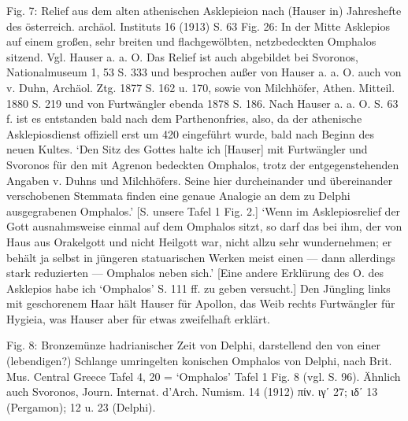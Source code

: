 \documentclass[a4paper, 11pt, oneside]{article}
\begin{document}
Fig. 7: Relief aus dem alten athenischen Asklepieion nach (Hauser in) Jahreshefte des österreich. archäol. Instituts 16 (1913) S. 63 Fig. 26: In der Mitte Asklepios auf einem großen, sehr breiten und flachgewölbten, netzbedeckten Omphalos sitzend. Vgl. Hauser a. a. O. Das Relief ist auch abgebildet bei Svoronos, Nationalmuseum 1, 53 S. 333 und besprochen außer von Hauser a. a. O. auch von v. Duhn, Archäol. Ztg. 1877 S. 162 u. 170, sowie von Milchhöfer, Athen. Mitteil. 1880 S. 219 und von Furtwängler ebenda 1878 S. 186. Nach Hauser a. a. O. S. 63 f. ist es entstanden bald nach dem Parthenonfries, also, da der athenische Asklepiosdienst offiziell erst um 420 eingeführt wurde, bald nach Beginn des neuen Kultes. `Den Sitz des Gottes halte ich [Hauser] mit Furtwängler und Svoronos für den mit Agrenon bedeckten Omphalos, trotz der entgegenstehenden Angaben v. Duhns und Milchhöfers. Seine hier durcheinander und übereinander verschobenen Stemmata finden eine genaue Analogie an dem zu Delphi ausgegrabenen Omphalos.' [S. unsere Tafel 1 Fig. 2.] `Wenn im Asklepiosrelief der Gott ausnahmsweise einmal auf dem Omphalos sitzt, so darf das bei ihm, der von Haus aus Orakelgott und nicht Heilgott war, nicht allzu sehr wundernehmen; er behält ja selbst in jüngeren statuarischen Werken meist einen --- dann allerdings stark reduzierten --- Omphalos neben sich.' [Eine andere Erklürung des O. des Asklepios habe ich `Omphalos' S. 111 ff. zu geben versucht.] Den Jüngling links mit geschorenem Haar hält Hauser für Apollon, das Weib rechts Furtwängler für Hygieia, was Hauser aber für etwas zweifelhaft erklärt.

Fig. 8: Bronzemünze hadrianischer Zeit von Delphi, darstellend den von einer (lebendigen?) Schlange umringelten konischen Omphalos von Delphi, nach Brit. Mus. Central Greece Tafel 4, 20 = `Omphalos' Tafel 1 Fig. 8 (vgl. S. 96). Ähnlich auch Svoronos, Journ. Internat. d'Arch. Numism. 14 (1912) πίν. ιγʹ 27; ιδʹ 13 (Pergamon); 12 u. 23 (Delphi).
\end{document}
